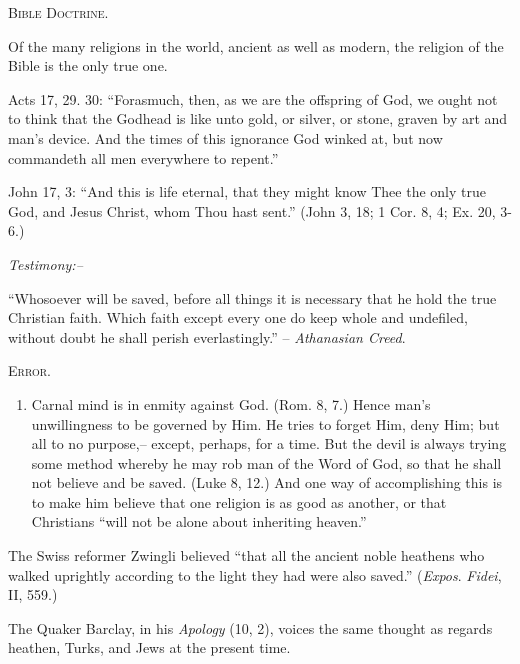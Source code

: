 \documentclass[
]{book}
\providecommand{\tightlist}{%
  \setlength{\itemsep}{0pt}\setlength{\parskip}{0pt}}
\begin{document}
\begin{center}
\textsc{Bible Doctrine.}
\end{center}

Of the many religions in the world, ancient as well as modern, the religion of the Bible is the only true one.

Acts 17, 29. 30: ``Forasmuch, then, as we are the offspring of God, we ought not to think that the Godhead is like unto gold, or silver, or stone, graven by art and man's device. And the times of this ignorance God winked at, but now commandeth all men everywhere to repent.''

John 17, 3: ``And this is life eternal, that they might know Thee the only true God, and Jesus Christ, whom Thou hast sent.'' (John 3, 18; 1 Cor. 8, 4; Ex. 20, 3-6.)

\begin{center}
\textsl{Testimony:--}
\end{center}

``Whosoever will be saved, before all things it is necessary that he hold the true Christian faith. Which faith except every one do keep whole and undefiled, without doubt he shall perish everlastingly.'' -- \emph{Athanasian Creed}.

\begin{center}
\textsc{Error.}
\end{center}

\begin{enumerate}
\def\labelenumi{\arabic{enumi}.}
\tightlist
\item
  Carnal mind is in enmity against God. (Rom. 8, 7.) Hence man's unwillingness to be governed by Him. He tries to forget Him, deny Him; but all to no purpose,-- except, perhaps, for a time. But the devil is always trying some method whereby he may rob man of the Word of God, so that he shall not believe and be saved. (Luke 8, 12.) And one way of accomplishing this is to make him believe that one religion is as good as another, or that Christians ``will not be alone about inheriting heaven.''
\end{enumerate}

The Swiss reformer Zwingli believed ``that all the ancient noble heathens who walked uprightly according to the light they had were also saved.'' (\emph{Expos}. \emph{Fidei}, II, 559.)

The Quaker Barclay, in his \emph{Apology} (10, 2), voices the same thought as regards heathen, Turks, and Jews at the present time.
\end{document}
